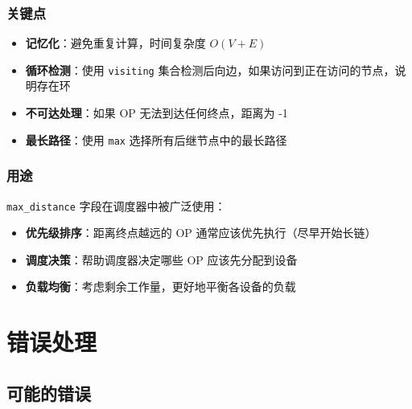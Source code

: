 \documentclass[12pt,a4paper]{article}
\begin{document}
\subsubsection{关键点}

\begin{itemize}
    \item \textbf{记忆化}：避免重复计算，时间复杂度 $O(V + E)$
    \item \textbf{循环检测}：使用 \texttt{visiting} 集合检测后向边，如果访问到正在访问的节点，说明存在环
    \item \textbf{不可达处理}：如果 OP 无法到达任何终点，距离为 -1
    \item \textbf{最长路径}：使用 \texttt{max} 选择所有后继节点中的最长路径
\end{itemize}

\subsubsection{用途}

\texttt{max\_distance} 字段在调度器中被广泛使用：
\begin{itemize}
    \item \textbf{优先级排序}：距离终点越远的 OP 通常应该优先执行（尽早开始长链）
    \item \textbf{调度决策}：帮助调度器决定哪些 OP 应该先分配到设备
    \item \textbf{负载均衡}：考虑剩余工作量，更好地平衡各设备的负载
\end{itemize}

\section{错误处理}

\subsection{可能的错误}
\end{document}
